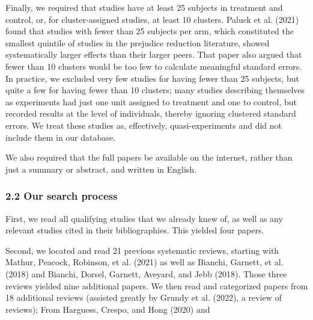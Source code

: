 \documentclass[
  man]{apa6}
\begin{document}
Finally, we required that studies have at least 25 subjects in treatment and control, or, for cluster-assigned studies, at least 10 clusters. Paluck et al. (2021) found that studies with fewer than 25 subjects per arm, which constituted the smallest quintile of studies in the prejudice reduction literature, showed systematically larger effects than their larger peers. That paper also argued that fewer than 10 clusters would be too few to calculate meaningful standard errors. In practice, we excluded very few studies for having fewer than 25 subjects, but quite a few for having fewer than 10 clusters; many studies describing themselves as experiments had just one unit assigned to treatment and one to control, but recorded results at the level of individuals, thereby ignoring clustered standard errors. We treat these studies as, effectively, quasi-experiments and did not include them in our database.

We also required that the full papers be available on the internet, rather than just a summary or abstract, and written in English.

\subsubsection{2.2 Our search process}\label{our-search-process}

First, we read all qualifying studies that we already knew of, as well as any relevant studies cited in their bibliographies. This yielded four papers.

Second, we located and read 21 previous systematic reviews, starting with Mathur, Peacock, Robinson, et al. (2021) as well as Bianchi, Garnett, et al. (2018) and Bianchi, Dorsel, Garnett, Aveyard, and Jebb (2018). Those three reviews yielded nine additional papers. We then read and categorized papers from 18 additional reviews (assisted greatly by Grundy et al. (2022), a review of reviews); From Harguess, Crespo, and Hong (2020) and
\end{document}
